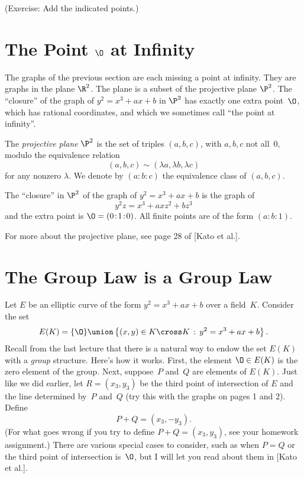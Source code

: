 \documentclass[11pt]{report}
\begin{document}
\noindent(Exercise: Add the indicated points.)

\section{The Point $\O$ at Infinity}
The graphs of the previous section are each missing
a point at infinity.
They are graphs in the plane $\R^2$.
The plane is a subset of the projective plane $\P^2$.
The ``closure'' of the graph of $y^2 = x^3 +ax+b$
in $\P^2$ has exactly one extra point~$\O$, which has
rational coordinates, and which we sometimes call ``the point at infinity''.
\begin{definition}
  The {\em projective plane} $\P^2$ is the set of triples $(a,b,c)$,
  with $a,b,c$ not all~$0$, modulo the equivalence relation
  $$(a,b,c)\sim (\lambda a ,\lambda b , \lambda c)$$
  for any nonzero $\lambda$.
  We denote by $(a\!:\!b\!:\!c)$ the equivalence class of $(a,b,c)$.
\end{definition}

The ``closure'' in $\P^2$ of the graph of $y^2 = x^3 + ax+b$ is the
graph of
$$
  y^2 z = x^3 + axz^2 + bz^3
$$
and the extra point is $\O=(0\!:\!1\!:\!0)$.
All finite points are of the form $(a\!:\!b\!:\!1)$.

For more about the projective plane, see page 28 of [Kato et al.].

\section{The Group Law is a Group Law}
Let $E$ be an elliptic curve of the form $y^2 = x^3 +ax+b$
over a field~$K$.
Consider the set
$$
  E(K) = \{\O\} \union
  \left\{ (x, y)\in K\cross K\,:\, y^2 = x^3 + ax + b\right\}.
$$
Recall from the last lecture that there is
a natural way to endow the set $E(K)$ with a {\em group}
structure.  Here's how it works.  First, the element $\O\in E(K)$
is the zero element of the group.  Next, suppose~$P$ and~$Q$
are elements of $E(K)$.  Just like we did earlier,
let $R=(x_3,y_3)$ be the third point of intersection
of $E$ and the line determined by~$P$ and~$Q$ (try this
with the graphs on pages 1 and 2).
Define
$$
  P + Q = (x_3, -y_3).
$$
(For what goes wrong if you try to define $P+Q=(x_3,y_3)$, see
your homework assignment.)
There are various special cases to consider, such as when $P=Q$ or
the third point of intersection is~$\O$, but I will let you read about
them in [Kato et al.].
\end{document}
